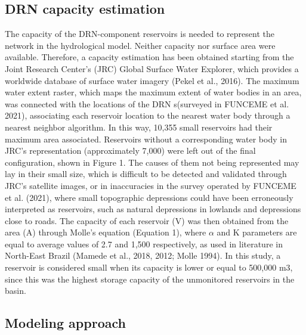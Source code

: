 \documentclass[draft]{agujournal2019}
\begin{document}
\subsection{DRN capacity estimation}
The capacity of the DRN-component reservoirs is needed to represent the network in the hydrological model.  Neither capacity nor surface area were available. Therefore, a capacity estimation has been obtained starting from the Joint Research Center’s (JRC) Global Surface Water Explorer, which provides a worldwide database of surface water imagery (Pekel et al., 2016). The maximum water extent raster, which maps the maximum extent of water bodies in an area, was connected with the locations of the DRN s(surveyed in FUNCEME et al. 2021), associating each reservoir location to the nearest water body through a nearest neighbor algorithm. In this way, 10,355 small reservoirs had their maximum area associated. Reservoirs without a corresponding water body in JRC’s representation (approximately 7,000) were left out of the final configuration, shown in Figure 1. The causes of them not being represented may lay in their small size, which is difficult to be detected and validated through JRC’s satellite images, or in inaccuracies in the survey operated by FUNCEME et al. (2021), where small topographic depressions could have been erroneously interpreted as reservoirs, such as natural depressions in lowlands and depressions close to roads. The capacity of each reservoir (V) was then obtained from the area (A) through Molle’s equation (Equation 1), where $\alpha$ and K parameters are equal to average values of 2.7 and 1,500 respectively, as used in literature in North-East Brazil (Mamede et al., 2018, 2012; Molle 1994). In this study, a reservoir is considered small when its capacity is lower or equal to 500,000 m3, since this was the highest storage capacity of the unmonitored reservoirs in the basin.

\subsection{Modeling approach}
\end{document}
